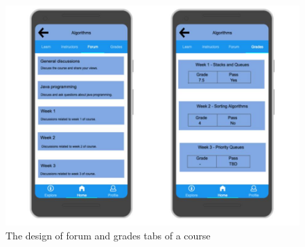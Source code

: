 \documentclass[version=last,fontsize=13pt]{scrartcl}
\begin{document}
		\begin{figure}[H]

			\centering	
			\includegraphics[scale = 0.45]{./imgs/prototype/forum+grades}
			\caption{The design of forum and grades tabs of a course}
			\label{fG}

		\end{figure}
\end{document}
